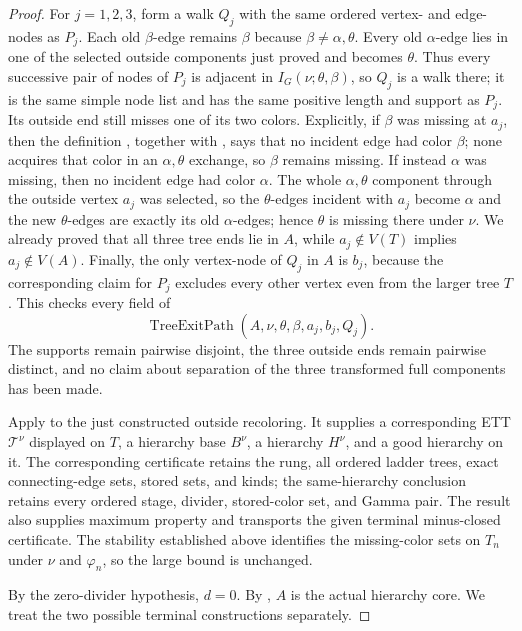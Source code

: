 \begin{proof}
For $j=1,2,3$, form a walk $Q_j$ with the same ordered vertex- and
edge-nodes as $P_j$.  Each old $\beta$-edge remains $\beta$ because
$\beta\ne\alpha,\theta$.  Every old $\alpha$-edge lies in one of the
selected outside components just proved and becomes $\theta$.  Thus
every successive pair of nodes of $P_j$ is adjacent in
$I_G(\nu;\theta,\beta)$, so $Q_j$ is a walk there; it is the same simple
node list and has the same positive length and support as $P_j$.
Its outside end still misses one of its two colors.  Explicitly, if
$\beta$ was missing at $a_j$, then the definition
, together with , says
that no incident edge had color $\beta$; none acquires that color in an
$\alpha,\theta$ exchange, so $\beta$ remains missing.  If instead
$\alpha$ was missing, then no incident edge had color $\alpha$.  The
whole $\alpha,\theta$ component through the outside vertex $a_j$ was
selected, so the $\theta$-edges incident with $a_j$ become $\alpha$ and
the new $\theta$-edges are exactly its old $\alpha$-edges; hence
$\theta$ is missing there under $\nu$.  We already proved that all three
tree ends lie in $A$, while $a_j\notin V(T)$ implies
$a_j\notin V(A)$.  Finally, the only vertex-node of $Q_j$ in $A$ is
$b_j$, because the corresponding claim for $P_j$ excludes every other
vertex even from the larger tree $T$.  This checks every field of
\[
       \operatorname{TreeExitPath}(A,\nu,\theta,\beta,a_j,b_j,Q_j).
       \tag{1}
\]
The supports remain pairwise disjoint, the three outside ends remain
pairwise distinct, and no claim about separation of the three
transformed full components has been made.

Apply  to the just constructed outside
recoloring.  It supplies a corresponding ETT $\mathcal T^\nu$ displayed
on $T$, a hierarchy base $B^\nu$, a hierarchy $H^\nu$, and a good
hierarchy on it.  The corresponding certificate retains the rung, all
ordered ladder trees, exact connecting-edge sets, stored sets, and kinds;
the same-hierarchy conclusion retains every ordered stage, divider,
stored-color set, and Gamma pair.  The result also supplies maximum
property and transports the given terminal minus-closed certificate.
The stability established above identifies the missing-color sets on
$T_n$ under $\nu$ and $\varphi_n$, so the large bound is unchanged.

By the zero-divider hypothesis, $d=0$.  By , $A$ is the
actual hierarchy core.  We treat the two possible terminal constructions
separately.


\end{proof}
